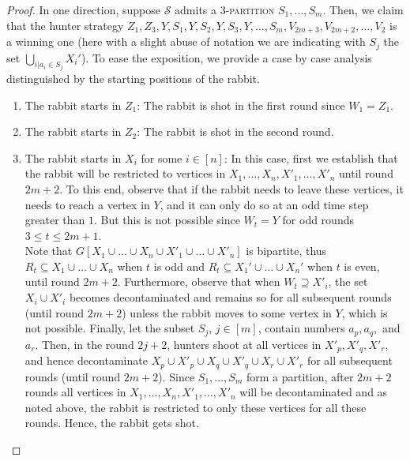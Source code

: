 \documentclass[runningheads]{llncs}
\begin{document}
\begin{proof}
In one direction, suppose $\mathcal{S}$ admits a \textsc{3-partition} $S_1,\ldots,S_m$. Then, we claim that the hunter strategy $Z_1, Z_3, Y, S_1, Y,  S_2, Y, S_3, Y,\ldots,S_m, V_{2m+3}, V_{2m+2},\ldots, V_2$ is a winning one  (here with a slight abuse of notation we are indicating with $S_j$ the set $\bigcup_{i | a_i \in S_j}X_i'$). 
To ease the exposition, we provide a case by case analysis distinguished by the starting positions of the rabbit.
\begin{enumerate}
    \item The rabbit starts in $Z_1$: The rabbit is {shot} in the first round since $W_1 = Z_1$.
    \item The rabbit starts in $Z_2$: 
    The rabbit is {shot}  in the second round.
    \item The rabbit starts in $X_i$ for some $i\in [n]$:  In this case, first we establish that the rabbit will be restricted to vertices in $X_1,\ldots,X_n, X'_1,\ldots,X'_n$ until round $2m+{2}$. To this end, observe that if the rabbit needs to leave these vertices, it needs to reach a vertex in $Y$, and it can only do so {at an odd time step greater than $1$. But this is not possible since $W_{t}=Y$ for odd rounds $3\le t \le 2m+1 $.\\%
    Note that $G[X_1\cup \ldots\cup X_n\cup X'_1\cup \ldots\cup X'_n]$ is bipartite, thus $R_t \subseteq X_1\cup \ldots \cup X_n$ when $t$ is odd and $R_t \subseteq X_1'\cup \ldots\cup X_n'$ when $t$ is even, until round $2m+2$. %
    Furthermore, observe that when $W_t\supseteq X'_i$, the set $X_i\cup X'_i$ becomes decontaminated and remains so for all subsequent rounds (until round $2m+2$)} unless the rabbit moves to some vertex in $Y$, which is not possible.
   Finally, let the subset $S_j$, $j\in [m]$, contain numbers $a_p,a_q,$ and $a_r$. Then, in the round $2j+2$, hunters shoot at all vertices in $X'_p,X'_q,X'_r$, and hence decontaminate
    $X_p\cup X'_p\cup X_q\cup X'_q \cup X_r \cup X'_r$ { for all subsequent rounds (until round $2m+2$)}. Since $S_1,\ldots, S_m$ form a partition, after $2m+2$ rounds all vertices in $X_1,\ldots,X_n, X'_1,\ldots,X'_n$ will be decontaminated and as noted above, the rabbit is restricted to only these vertices for all these rounds. Hence, the rabbit gets shot. 
    

\end{enumerate}
\end{proof}
\end{document}
